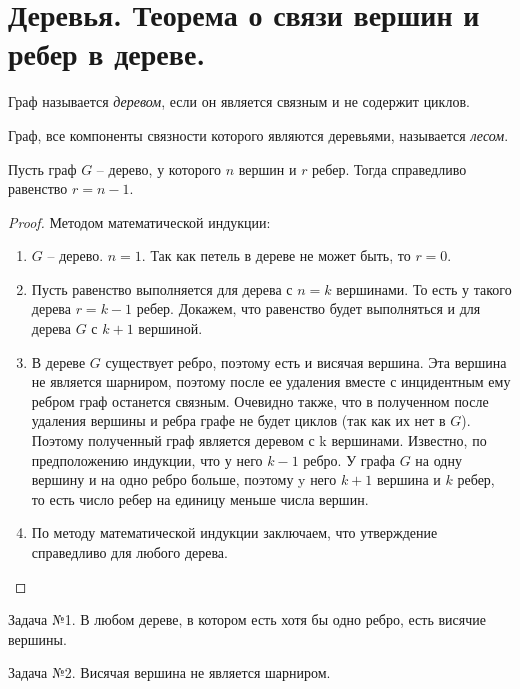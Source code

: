 \section{Деревья. Теорема о связи вершин и ребер в дереве.}

\begin{definition}
    Граф называется \textit{деревом}, если он является связным и не
    содержит циклов.
\end{definition}

\begin{definition}
    Граф, все компоненты связности которого являются деревьями,
    называется \textit{лесом}.
\end{definition}

\begin{theorem}
    Пусть граф $G$ -- дерево, у которого $n$ вершин и $r$ ребер. Тогда
    справедливо равенство $r = n - 1$.
\end{theorem}

\begin{proof}
    Методом математической индукции:
    \begin{enumerate}[left=0.0em, labelsep=1em, topsep=0.0em, itemsep=0pt, parsep=0.5em]
        \item $G$ -- дерево. $n=1$. Так как петель в дереве не может быть, то $r=0$.
        \item Пусть равенство выполняется для дерева с $n = k$ вершинами. То есть у
        такого дерева $r = k - 1$ ребер. Докажем, что равенство будет выполняться
        и для дерева $G$ с $k+1$ вершиной.
        \item В дереве $G$ существует ребро, поэтому есть и висячая вершина. Эта
        вершина не является шарниром, поэтому после ее удаления вместе с
        инцидентным ему ребром граф останется связным. Очевидно также, что
        в полученном после удаления вершины и ребра графе не будет циклов
        (так как их нет в $G$). Поэтому полученный граф является деревом с k
        вершинами. Известно, по предположению индукции, что у него $k - 1$
        ребро. У графа $G$ на одну вершину и на одно ребро больше, поэтому y
        него $k+1$ вершина и $k$ ребер, то есть число ребер на единицу меньше
        числа вершин.
        \item По методу математической индукции заключаем, что утверждение
        справедливо для любого дерева.
    \end{enumerate}
\end{proof}

Задача №1. В любом дереве, в котором есть хотя бы одно ребро, есть висячие
вершины.

Задача №2. Висячая вершина не является шарниром.
